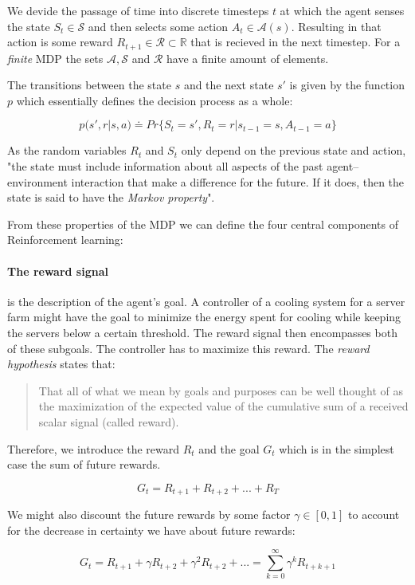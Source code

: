 We devide the passage of time into discrete timesteps $ t $ at which the agent senses the state $ S_t \in \mathcal{S} $ and then selects some action $ A_t \in \mathcal{A}(s) $. Resulting in that action is some reward $ R_{t+1} \in \mathcal{R} \subset \mathbb{R} $ that is recieved in the next timestep. For a \textit{finite} MDP the sets $ \mathcal{A}, \mathcal{S}$ and $ \mathcal{R} $ have a finite amount of elements.

The transitions between the state $ s $ and the next state $ s' $ is given by the function $ p $ which essentially defines the decision process as a whole:

$$
    p(s', r | s, a) \doteq Pr\{S_t=s', R_t = r | s_{t-1} = s, A_{t-1}=a\}
$$

As the random variables $ R_t $ and $ S_t $ only depend on the previous state and action, "the state must include information about all aspects of the past agent–environment interaction that make a difference for the future. If it does, then the state is said to have the \textit{Markov property}". \cite[p. 48]{sutton_reinforcement_2018}

From these properties of the MDP we can define the four central components of Reinforcement learning:

\paragraph{The reward signal} is the description of the agent's goal. A controller of a cooling system for a server farm might have the goal to minimize the energy spent for cooling while keeping the servers below a certain threshold. The reward signal then encompasses both of these subgoals. The controller has to maximize this reward. The \textit{reward hypothesis} states that:
\begin{quotation}
    That all of what we mean by goals and purposes can be well thought of as the maximization of the expected value of the cumulative sum of a received scalar signal (called reward).
\end{quotation}
Therefore, we introduce the reward $R_t $ and the goal $ G_t $ which is in the simplest case the sum of future rewards.

$$ G_t = R_{t+1} + R_{t+2} + ... + R_T $$

We might also discount the future rewards by some factor $\gamma \in [0, 1] $ to account for the decrease in certainty we have about future rewards:

$$ G_t = R_{t+1} + \gamma R_{t+2} + \gamma^2 R_{t+2} + ... = \sum_{k=0}^{\infty} \gamma^kR_{t+k+1}$$

